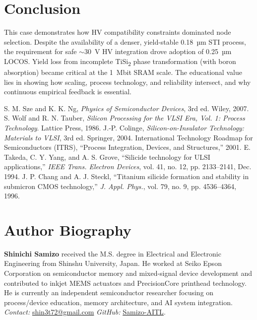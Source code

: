 \documentclass[conference]{IEEEtran}
\begin{document}
\section{Conclusion}
This case demonstrates how HV compatibility constraints dominated node selection.  
Despite the availability of a denser, yield-stable 0.18~µm STI process, the requirement for safe $\sim$30~V HV integration drove adoption of 0.25~µm LOCOS.  
Yield loss from incomplete TiSi\textsubscript{2} phase transformation (with boron absorption) became critical at the 1~Mbit SRAM scale.  
The educational value lies in showing how scaling, process technology, and reliability intersect, and why continuous empirical feedback is essential.

\begin{thebibliography}{99}
 S. M. Sze and K. K. Ng, \textit{Physics of Semiconductor Devices}, 3rd ed. Wiley, 2007.
 S. Wolf and R. N. Tauber, \textit{Silicon Processing for the VLSI Era, Vol. 1: Process Technology}. Lattice Press, 1986.
 J.-P. Colinge, \textit{Silicon-on-Insulator Technology: Materials to VLSI}, 3rd ed. Springer, 2004.
 International Technology Roadmap for Semiconductors (ITRS), ``Process Integration, Devices, and Structures,'' 2001.
 E. Takeda, C. Y. Yang, and A. S. Grove, ``Silicide technology for ULSI applications,'' \textit{IEEE Trans. Electron Devices}, vol. 41, no. 12, pp. 2133--2141, Dec. 1994.
 J. P. Chang and A. J. Steckl, ``Titanium silicide formation and stability in submicron CMOS technology,'' \textit{J. Appl. Phys.}, vol. 79, no. 9, pp. 4536--4364, 1996.
\end{thebibliography}

\section*{Author Biography}
\textbf{Shinichi Samizo} received the M.S. degree in Electrical and Electronic Engineering from Shinshu University, Japan. 
He worked at Seiko Epson Corporation on semiconductor memory and mixed-signal device development and contributed to inkjet MEMS actuators and PrecisionCore printhead technology. 
He is currently an independent semiconductor researcher focusing on process/device education, memory architecture, and AI system integration.\\
\emph{Contact:} \href{mailto:shin3t72@gmail.com}{shin3t72@gmail.com}\quad
\emph{GitHub:} \href{https://github.com/Samizo-AITL}{Samizo-AITL}.
\end{document}
